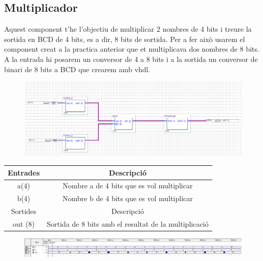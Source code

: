 \documentclass[12pt, a4papre]{article}
\begin{document}
	\subsection{Multiplicador}
	
	Aquest component t'he l'objectiu de multiplicar 2 nombres de 4 bits i treure la sortida en BCD de 4 bits, es a dir, 8 bits de sortida. Per a fer això usarem el component creat a la practica anterior que et multiplicava dos nombres de 8 bits. A la entrada hi posarem un conversor de 4 a 8 bits i a la sortida un conversor de binari de 8 bits a BCD que crearem amb vhdl.
	
	\begin{figure}[H]
		\begin{center}
		\includegraphics[width=130mm]{Mult_Bin_BCD.jpeg}
		\end{center}
	\end{figure}
	
	\begin{table}[h!]
		\centering
		 \begin{tabular}{|c | c|} 
			 \hline
			 Entrades & Descripció\\ [0.5ex] 
			 \hline
			 a(4) &  Nombre a de 4 bits que es vol multiplicar\\ 
			 b(4) &  Nombre b de 4 bits que es vol multiplicar\\ 
			 \hline\hline
			 Sortides & Descripció\\ [0.5ex] 
			 \hline
			out (8) & Sortida de 8 bits amb el resultat de la multiplicació\\ 
			 \hline
		 \end{tabular}
	\end{table}
	
	\begin{figure}[H]
		\begin{center}
		\includegraphics[width=130mm]{SimMult.jpeg}
		\end{center}
	\end{figure}
	
\end{document}
